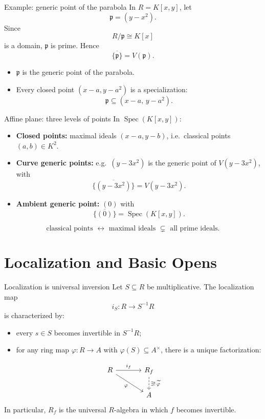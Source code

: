 \documentclass[10pt, aspectratio=169]{beamer}
\DeclareMathOperator{\Spec}{Spec}
\begin{document}
\begin{frame}{Example: generic point of the parabola}
    In $R = K[x,y]$, let
    \[
    \mathfrak p = (y-x^2).
    \]
    Since
    \[
    R/\mathfrak p \cong K[x]
    \]
    is a domain, $\mathfrak p$ is prime. Hence
    \[
    \overline{\{\mathfrak p\}} = V(\mathfrak p).
    \]
    \begin{itemize}
        \item $\mathfrak p$ is the generic point of the parabola.
        \item Every closed point $(x-a, y-a^2)$ is a specialization:
        \[
        \mathfrak p \subseteq (x-a,\, y-a^2).
        \]
    \end{itemize}
\end{frame}

\begin{frame}{Affine plane: three levels of points}
    In $\Spec(K[x,y])$:
    \begin{itemize}
        \item \textbf{Closed points:} maximal ideals $(x-a, y-b)$, i.e.\ classical points $(a,b) \in K^2$.
        \item \textbf{Curve generic points:} e.g.\ $(y-3x^2)$ is the generic point of $V(y-3x^2)$, with
        \[
        \overline{\{(y-3x^2)\}} = V(y-3x^2).
        \]
        \item \textbf{Ambient generic point:} $(0)$ with
        \[
        \overline{\{(0)\}} = \Spec(K[x,y]).
        \]
    \end{itemize}
    \[
    \boxed{\text{classical points } \leftrightarrow \text{ maximal ideals } \subsetneq \text{ all prime ideals}.}
    \]
\end{frame}

\section{Localization and Basic Opens}

\begin{frame}[fragile]{Localization is universal inversion}
    Let $S \subseteq R$ be multiplicative. The localization map
    \[
    i_S : R \longrightarrow S^{-1}R
    \]
    is characterized by:
    \begin{itemize}
        \item every $s \in S$ becomes invertible in $S^{-1}R$;
        \item for any ring map $\varphi : R \to A$ with $\varphi(S) \subseteq A^\times$, there is a unique factorization:
    \end{itemize}
    \[
    \begin{tikzcd}[column sep=large]
        R \arrow[r, "i_f"] \arrow[dr, "\varphi"'] & R_f \arrow[d, dashed, "\exists!\,\widetilde\varphi"] \\
        & A
    \end{tikzcd}
    \]
    In particular, $R_f$ is the universal $R$-algebra in which $f$ becomes invertible.
\end{frame}
\end{document}
